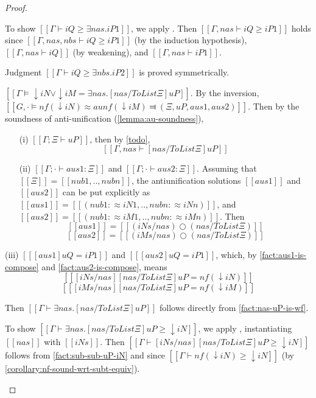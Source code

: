 \begin{proof}
\begin{caseof}
     To show $[[Γ ⊢ iQ ≥ ∃nas.iP1]]$, we apply
     .
     Then $[[Γ, nas ⊢ iQ ≥ iP1]]$ holds since
     $[[Γ, nas, nbs ⊢ iQ ≥ iP1]]$ (by the induction hypothesis),
     $[[Γ, nas ⊢ iQ]]$ (by weakening), and $[[Γ, nas ⊢ iP1]]$.

     Judgment $[[Γ ⊢ iQ ≥ ∃nbs.iP2]]$ is proved symmetrically.
  \item $[[Γ ⊨ ↓iN ∨ ↓iM = ∃nas.[nas / ToList Ξ]uP]]$.
    By the inversion, $[[G,· ⊨ nf(↓iN) ≈au nf(↓iM) ⫤ (Ξ, uP, aus1, aus2)]]$.
    Then by the soundness of anti-unification (\cref{lemma:au-soundness}),
    \begin{enumerate}
    \item[(i)] $[[Γ ; Ξ ⊢ uP]]$, then
      by \cref{todo},
      \begin{equation} \label{fact:nas-uP-is-wf} [[Γ, nas ⊢ [nas / ToList Ξ]uP]] \end{equation}
    \item[(ii)] $[[Γ ; · ⊢ aus1 : Ξ]]$ and $[[Γ ; · ⊢ aus2 : Ξ]]$.
      Assuming that $[[Ξ]] = [[nub1,..,nubn]]$,
      the antiunification solutions $[[aus1]]$ and $[[aus2]]$ can be
      put explicitly as $[[aus1]] = [[(nub1 :≈ iN1,..,nubn :≈ iNn)]]$,
      and $[[aus2]] = [[(nub1 :≈ iM1,..,nubn :≈ iMn)]]$.
      Then
      \begin{equation}
        \label{fact:aus1-is-compose}
        [[ aus1 ]] = [[ (iNs / nas) ○ (nas / ToList Ξ) ]] 
      \end{equation}
      \begin{equation}
        \label{fact:aus2-is-compose}
        [[ aus2 ]] = [[ (iMs / nas) ○ (nas / ToList Ξ) ]]
      \end{equation}
    \end{enumerate}
  \item[(iii)] $[[ [aus1] uQ = iP1 ]]$ and $[[ [aus2] uQ = iP1 ]]$,
    which, by \ref{fact:aus1-is-compose} and \ref{fact:aus2-is-compose},
    means
    \begin{equation}
      \label{fact:sub-sub-uP-iN}
      [[ [iNs / nas][nas / ToList Ξ]uP = nf(↓iN) ]]
    \end{equation}
    \begin{equation}
      \label{fact:sub-sub-uP-iM}
      [[ [iMs / nas][nas / ToList Ξ]uP = nf(↓iM) ]]
    \end{equation}

    Then $[[Γ ⊢ ∃nas.[nas / ToList Ξ]uP]]$
    follows directly from \ref{fact:nas-uP-is-wf}.

    To show $[[Γ ⊢ ∃nas.[nas / ToList Ξ]uP ≥ ↓iN]]$,
    we apply ,
    instantiating $[[nas]]$ with $[[iNs]]$.
    Then $[[Γ ⊢ [iNs / nas][nas / ToList Ξ]uP ≥ ↓iN ]]$ follows
    from \ref{fact:sub-sub-uP-iN} and 
    since $[[Γ ⊢ nf(↓iN) ≥ ↓iN]]$ (by \cref{corollary:nf-sound-wrt-subt-equiv}).


\end{caseof}
\end{proof}
